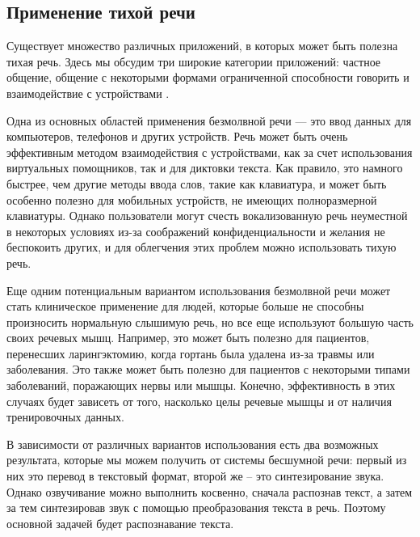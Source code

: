 \subsection{Применение тихой речи}

Существует множество различных приложений, в которых может быть полезна тихая речь. Здесь мы обсудим три широкие категории приложений: частное общение, общение с некоторыми формами ограниченной способности говорить и взаимодействие с устройствами \cite{bib:control:1}.

Одна из основных областей применения безмолвной речи — это ввод данных для компьютеров, телефонов и других устройств. Речь может быть очень эффективным методом взаимодействия с устройствами, как за счет использования виртуальных помощников, так и для диктовки текста. Как правило, это намного быстрее, чем другие методы ввода слов, такие как клавиатура, и может быть особенно полезно для мобильных устройств, не имеющих полноразмерной клавиатуры. Однако пользователи могут счесть вокализованную речь неуместной в некоторых условиях из-за соображений конфиденциальности и желания не беспокоить других, и для облегчения этих проблем можно использовать тихую речь.

Еще одним потенциальным вариантом использования безмолвной речи может стать клиническое применение для людей, которые больше не способны произносить нормальную слышимую речь, но все еще используют большую часть своих речевых мышц. Например, это может быть полезно для пациентов, перенесших ларингэктомию, когда гортань была удалена из-за травмы или заболевания. Это также может быть полезно для пациентов с некоторыми типами заболеваний, поражающих нервы или мышцы. Конечно, эффективность в этих случаях будет зависеть от того, насколько целы речевые мышцы и от наличия тренировочных данных.

В зависимости от различных вариантов использования есть два возможных результата, которые мы можем получить от системы бесшумной речи: первый из них это перевод в текстовый формат, второй же – это синтезирование звука. Однако озвучивание можно выполнить косвенно, сначала распознав текст, а затем за тем синтезировав звук с помощью преобразования текста в речь. Поэтому основной задачей будет распознавание текста.
